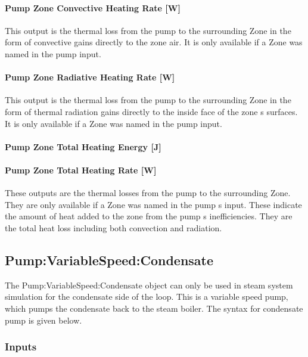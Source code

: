 \paragraph{Pump Zone Convective Heating Rate {[}W{]}}\label{pump-zone-convective-heating-rate-w-1}

This output is the thermal loss from the pump to the surrounding Zone in the form of convective gains directly to the zone air. It is only available if a Zone was named in the pump input.

\paragraph{Pump Zone Radiative Heating Rate {[}W{]}}\label{pump-zone-radiative-heating-rate-w-1}

This output is the thermal loss from the pump to the surrounding Zone in the form of thermal radiation gains directly to the inside face of the zone s surfaces. It is only available if a Zone was named in the pump input.

\paragraph{Pump Zone Total Heating Energy {[}J{]}}\label{pump-zone-total-heating-energy-j-1}

\paragraph{Pump Zone Total Heating Rate {[}W{]}}\label{pump-zone-total-heating-rate-w-1}

These outputs are the thermal losses from the pump to the surrounding Zone. They are only available if a Zone was named in the pump s input. These indicate the amount of heat added to the zone from the pump s inefficiencies. They are the total heat loss including both convection and radiation.

\subsection{Pump:VariableSpeed:Condensate}\label{pumpvariablespeedcondensate}

The Pump:VariableSpeed:Condensate object can only be used in steam system simulation for the condensate side of the loop. This is a variable speed pump, which pumps the condensate back to the steam boiler. The syntax for condensate pump is given below.

\subsubsection{Inputs}\label{inputs-2-031}

